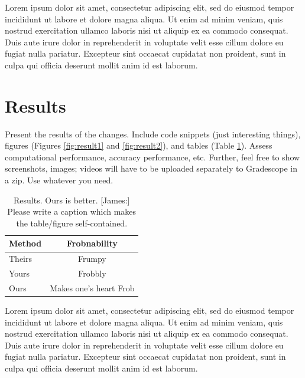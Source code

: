 \documentclass[10pt,twocolumn,letterpaper]{article}
\begin{document}
Lorem ipsum dolor sit amet, consectetur adipiscing elit, sed do eiusmod tempor incididunt ut labore et dolore magna aliqua. Ut enim ad minim veniam, quis nostrud exercitation ullamco laboris nisi ut aliquip ex ea commodo consequat. Duis aute irure dolor in reprehenderit in voluptate velit esse cillum dolore eu fugiat nulla pariatur. Excepteur sint occaecat cupidatat non proident, sunt in culpa qui officia deserunt mollit anim id est laborum.

\section{Results}

Present the results of the changes. Include code snippets (just interesting things), figures (Figures \ref{fig:result1} and \ref{fig:result2}), and tables (Table \ref{tab:example}). Assess computational performance, accuracy performance, etc. Further, feel free to show screenshots, images; videos will have to be uploaded separately to Gradescope in a zip. Use whatever you need.

\begin{table}
\begin{center}
\begin{tabular}{ l c }
\toprule
Method & Frobnability \\
\midrule
Theirs & Frumpy \\
Yours & Frobbly \\
Ours & Makes one's heart Frob\\
\bottomrule
\end{tabular}
\end{center}
\caption{Results. Ours is better. [James:] Please write a caption which makes the table/figure self-contained.}
\label{tab:example}
\end{table}

Lorem ipsum dolor sit amet, consectetur adipiscing elit, sed do eiusmod tempor incididunt ut labore et dolore magna aliqua. Ut enim ad minim veniam, quis nostrud exercitation ullamco laboris nisi ut aliquip ex ea commodo consequat. Duis aute irure dolor in reprehenderit in voluptate velit esse cillum dolore eu fugiat nulla pariatur. Excepteur sint occaecat cupidatat non proident, sunt in culpa qui officia deserunt mollit anim id est laborum.
\end{document}
